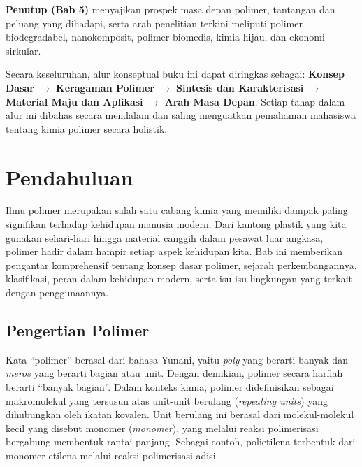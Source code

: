 \documentclass[12pt,a4paper,openany]{book}
\begin{document}
\textbf{Penutup (Bab 5)} menyajikan prospek masa depan polimer, tantangan dan peluang yang dihadapi, serta arah penelitian terkini meliputi polimer biodegradabel, nanokomposit, polimer biomedis, kimia hijau, dan ekonomi sirkular.

Secara keseluruhan, alur konseptual buku ini dapat diringkas sebagai: \textbf{Konsep Dasar} $\rightarrow$ \textbf{Keragaman Polimer} $\rightarrow$ \textbf{Sintesis dan Karakterisasi} $\rightarrow$ \textbf{Material Maju dan Aplikasi} $\rightarrow$ \textbf{Arah Masa Depan}. Setiap tahap dalam alur ini dibahas secara mendalam dan saling menguatkan pemahaman mahasiswa tentang kimia polimer secara holistik.

\newpage

\listoftables
{}
\newpage

\mainmatter

\chapter{Pendahuluan}

Ilmu polimer merupakan salah satu cabang kimia yang memiliki dampak paling signifikan terhadap kehidupan manusia modern. Dari kantong plastik yang kita gunakan sehari-hari hingga material canggih dalam pesawat luar angkasa, polimer hadir dalam hampir setiap aspek kehidupan kita. Bab ini memberikan pengantar komprehensif tentang konsep dasar polimer, sejarah perkembangannya, klasifikasi, peran dalam kehidupan modern, serta isu-isu lingkungan yang terkait dengan penggunaannya.

\section{Pengertian Polimer}

Kata ``polimer'' berasal dari bahasa Yunani, yaitu \textit{poly} yang berarti banyak dan \textit{meros} yang berarti bagian atau unit. Dengan demikian, polimer secara harfiah berarti ``banyak bagian''. Dalam konteks kimia, polimer didefinisikan sebagai makromolekul yang tersusun atas unit-unit berulang (\textit{repeating units}) yang dihubungkan oleh ikatan kovalen. Unit berulang ini berasal dari molekul-molekul kecil yang disebut monomer (\textit{monomer}), yang melalui reaksi polimerisasi bergabung membentuk rantai panjang. Sebagai contoh, polietilena  terbentuk dari monomer etilena  melalui reaksi polimerisasi adisi.
\end{document}
